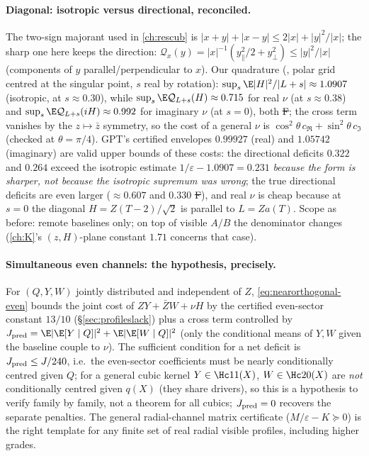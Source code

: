 \paragraph{Diagonal: isotropic versus directional, reconciled.} The two-sign majorant used in \autoref{ch:rescub} is $|x+y|+|x-y|\le2|x|+|y|^2/|x|$; the sharp one here keeps the direction:
$\mathcal Q_x(y)=|x|^{-1}(y_\parallel^2/2+y_\perp^2)\le|y|^2/|x|$ (components of $y$ parallel/perpendicular to $x$). Our quadrature (, polar grid centred at
the singular point, $s$ real by rotation): $\sup_s\E|H|^2/|L+s|\approx1.0907$ (isotropic, at $s\approx0.30$), while $\sup_s\E\mathcal Q_{L+s}(H)\approx0.715$ for real $\nu$ (at $s\approx0.38$) and
$\sup_s\E\mathcal Q_{L+s}(iH)\approx0.992$ for imaginary $\nu$ (at $s=0$), both \st{F}; the cross term vanishes by the $z\mapsto\bar z$ symmetry, so the cost of a general $\nu$ is
$\cos^2\!\theta\,c_{\Re}+\sin^2\!\theta\,c_{\Im}$ (checked at $\theta=\pi/4$). GPT's certified envelopes $0.99927$ (real) and $1.05742$ (imaginary) are valid upper bounds of these costs: the
directional deficits $0.322$ and $0.264$ exceed the isotropic estimate $1/\varepsilon-1.0907=0.231$ \emph{because the form is sharper, not because the isotropic supremum was wrong}; the true
directional deficits are even larger ($\approx0.607$ and $0.330$ \st{F}), and real $\nu$ is cheap because at $s=0$ the diagonal $H=Z(T-2)/\sqrt2$ is parallel to $L=Za(T)$. Scope as before:
remote baselines only; on top of visible $A/B$ the denominator changes (\autoref{ch:K}'s $(z,H)$-plane constant $1.71$ concerns that case).
\paragraph{Simultaneous even channels: the hypothesis, precisely.} For $(Q,Y,W)$ jointly distributed and independent of $Z$, \eqref{eq:nearorthogonal-even} bounds the joint cost of
$ZY+\bar ZW+\nu H$ by the certified even-sector constant $13/10$ (\S\ref{sec:profileslack}) plus a cross term controlled by $J_{\rm pred}=\E|\E[Y\mid Q]|^2+\E|\E[W\mid Q]|^2$ (only the conditional
means of $Y,W$ given the baseline couple to $\nu$). The sufficient condition for a net deficit is $J_{\rm pred}\le J/240$, i.e.\ the even-sector coefficients must be nearly conditionally centred
given $Q$; for a general cubic kernel $Y\in\Hc11(X)$, $W\in\Hc20(X)$ are \emph{not} conditionally centred given $q(X)$ (they share drivers), so this is a hypothesis to verify family by family,
not a theorem for all cubics; $J_{\rm pred}=0$ recovers the separate penalties. The general radial-channel matrix certificate ($M/\varepsilon-K\succeq0$) is the right template for any finite set of
real radial visible profiles, including higher grades.
